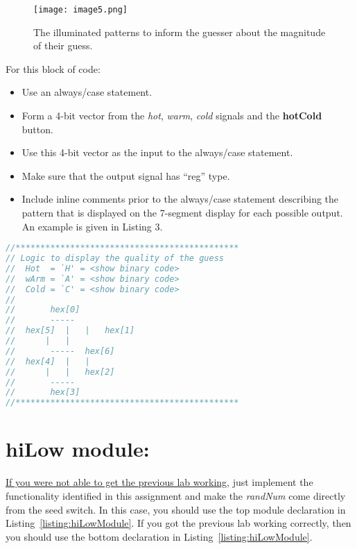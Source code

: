 \begin{figure}
\texttt{[image:  image5.png]}
\caption{The illuminated patterns to inform the guesser about the magnitude of their guess.}
\label{figure:hiLoHintSevenSeg}
\end{figure}

For this block of code:

\begin{itemize}
\item
  Use an always/case statement.
\item
  Form a 4-bit vector from the \emph{hot}, \emph{warm}, \emph{cold}
  signals and the \textbf{hotCold} button.
\item
  Use this 4-bit vector as the input to the always/case statement.
\item
  Make sure that the output signal has ``reg'' type.
\item
  Include inline comments prior to the always/case statement describing
  the pattern that is displayed on the 7-segment display for each
  possible output. An example is given in Listing 3.
\end{itemize}

\begin{lstlisting}[language=Verilog,
 caption={A comment block describing the pattern of illuminated segment for each guess hint..},
 label={listing:hotColdGuess},
 frame=single]
//*********************************************
// Logic to display the quality of the guess
//	Hot  = `H' = <show binary code>
//	wArm = `A' = <show binary code>
//	Cold = `C' = <show binary code>
//
//		 hex[0]
//		 -----
//	hex[5]	|	|	hex[1]
//		|	|	
//		 -----	hex[6]
//	hex[4]	|	|
//		|	|	hex[2]
//		 -----
//		 hex[3]
//*********************************************
\end{lstlisting}

\hypertarget{hilow-module}{%
\section{hiLow module:}\label{section:hilow-module}}

\uline{If you were not able to get the previous lab working}, just
implement the functionality identified in this assignment and make the
\emph{randNum} come directly from the seed switch. In this case, you
should use the top module declaration in Listing~\ref{listing:hiLowModule}. If you got the
previous lab working correctly, then you should use the bottom
declaration in Listing~\ref{listing:hiLowModule}.



